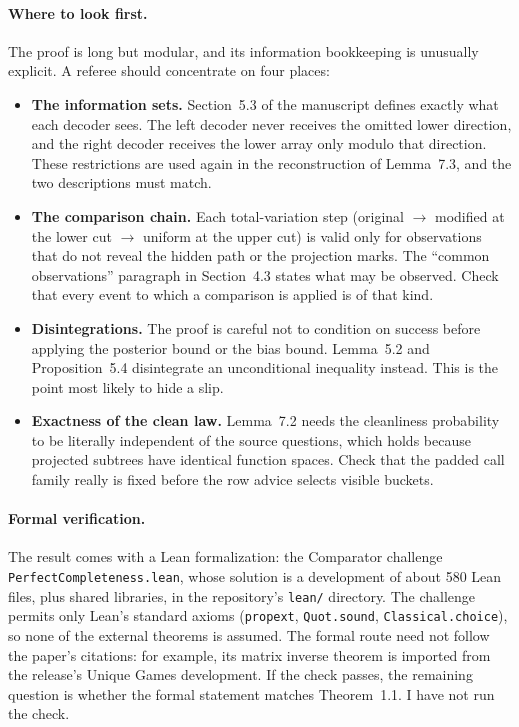 \documentclass[11pt]{article}
\theoremstyle{definition}
\theoremstyle{remark}
\begin{document}
\paragraph{Where to look first.} The proof is long but modular, and its
information bookkeeping is unusually explicit. A referee should concentrate on
four places:
\begin{itemize}
\item \textbf{The information sets.} Section~5.3 of the manuscript defines
exactly what each decoder sees. The left decoder never receives the omitted
lower direction, and the right decoder receives the lower array only modulo
that direction. These restrictions are used again in the reconstruction of
Lemma~7.3, and the two descriptions must match.
\item \textbf{The comparison chain.} Each total-variation step (original
$\to$ modified at the lower cut $\to$ uniform at the upper cut) is valid only
for observations that do not reveal the hidden path or the projection marks.
The ``common observations'' paragraph in Section~4.3 states what may be
observed. Check that every event to which a comparison is applied is of that
kind.
\item \textbf{Disintegrations.} The proof is careful not to condition on
success before applying the posterior bound or the bias bound. Lemma~5.2 and
Proposition~5.4 disintegrate an unconditional inequality instead. This is the
point most likely to hide a slip.
\item \textbf{Exactness of the clean law.} Lemma~7.2 needs the cleanliness
probability to be literally independent of the source questions, which holds
because projected subtrees have identical function spaces. Check that the
padded call family really is fixed before the row advice selects visible
buckets.
\end{itemize}

\paragraph{Formal verification.} The result comes with a Lean
formalization: the Comparator challenge \texttt{PerfectCompleteness.lean},
whose solution is a development of about 580 Lean files, plus shared
libraries, in the repository's
\texttt{lean/} directory. The challenge permits only Lean's standard axioms
(\texttt{propext}, \texttt{Quot.sound}, \texttt{Classical.choice}), so none
of the external theorems is assumed. The formal route need not follow the
paper's citations: for example, its matrix inverse theorem is imported from
the release's Unique Games development. If the check passes, the remaining
question is whether the formal statement matches Theorem~1.1. I have not run
the check.
\end{document}
